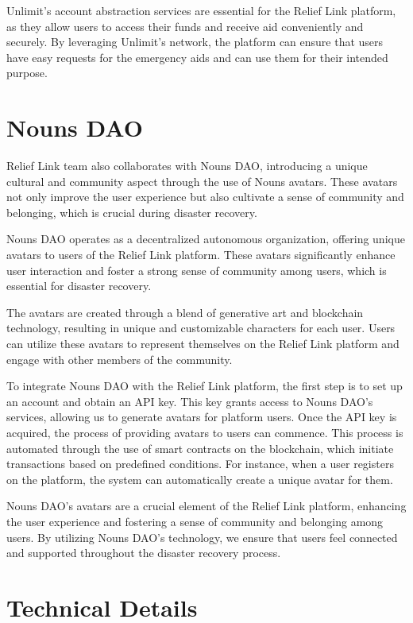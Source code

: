 \documentclass[conference]{IEEEtran}
\begin{document}
Unlimit's account abstraction services are essential for the Relief Link platform, as they allow users to access their funds and receive aid conveniently and securely. By leveraging Unlimit's network, the platform can ensure that users have easy requests for the emergency aids and can use them for their intended purpose.

\section{Nouns DAO}
Relief Link team also collaborates with Nouns DAO, introducing a unique cultural and community aspect through the use of Nouns avatars. These avatars not only improve the user experience but also cultivate a sense of community and belonging, which is crucial during disaster recovery.

Nouns DAO operates as a decentralized autonomous organization, offering unique avatars to users of the Relief Link platform. These avatars significantly enhance user interaction and foster a strong sense of community among users, which is essential for disaster recovery.

The avatars are created through a blend of generative art and blockchain technology, resulting in unique and customizable characters for each user. Users can utilize these avatars to represent themselves on the Relief Link platform and engage with other members of the community.

To integrate Nouns DAO with the Relief Link platform, the first step is to set up an account and obtain an API key. This key grants access to Nouns DAO's services, allowing us to generate avatars for platform users. Once the API key is acquired, the process of providing avatars to users can commence. This process is automated through the use of smart contracts on the blockchain, which initiate transactions based on predefined conditions. For instance, when a user registers on the platform, the system can automatically create a unique avatar for them.

Nouns DAO's avatars are a crucial element of the Relief Link platform, enhancing the user experience and fostering a sense of community and belonging among users. By utilizing Nouns DAO's technology, we ensure that users feel connected and supported throughout the disaster recovery process.

\section{Technical Details}
\end{document}
